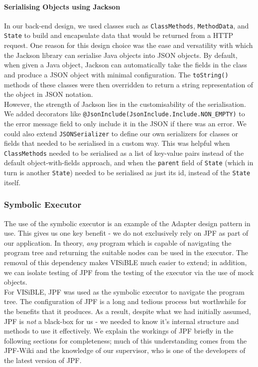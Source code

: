 \documentclass[titlepage,11pt]{article}
\begin{document}
\paragraph{Serialising Objects using Jackson}

In our back-end design, we used classes such as \texttt{ClassMethods}, \texttt{MethodData}, and \texttt{State} to build and encapsulate data that would be returned from a HTTP request. One reason for this design choice was the ease and versatility with which the Jackson library can serialise Java objects into JSON objects. By default, when given a Java object, Jackson \cite{jackson} can automatically take the fields in the class and produce a JSON object with minimal configuration. The \texttt{toString()} methods of these classes were then overridden to return a string representation of the object in JSON notation. \\

However, the strength of Jackson lies in the customisability of the serialisation. We added decorators like \texttt{@JsonInclude(JsonInclude.Include.NON\_EMPTY)} to the error message field to only include it in the JSON if there was an error. We could also extend \texttt{JSONSerializer} to define our own serializers for classes or fields that needed to be serialised in a custom way. This was helpful when \texttt{ClassMethods} needed to be serialised as a list of key-value pairs instead of the default object-with-fields approach, and when the \texttt{parent} field of \texttt{State} (which in turn is another \texttt{State}) needed to be serialised as just its id, instead of the \texttt{State} itself.

\subsubsection{Symbolic Executor}
The use of the symbolic executor is an example of the Adapter design pattern in use. This gives us one key benefit - we do not exclusively rely on JPF as part of our application. In theory, \textit{any} program which is capable of navigating the program tree and returning the suitable nodes can be used in the executor. The removal of this dependency makes VISiBLE much easier to extend; in addition, we can isolate testing of JPF from the testing of the executor via the use of mock objects. \\

For VISiBLE, JPF was used as the symbolic executor to navigate the program tree. The configuration of JPF is a long and tedious process but worthwhile for the benefits that it produces. As a result, despite what we had initially assumed, JPF is \textit{not} a black-box for us - we needed to know it's internal structure and methods to use it effectively. We explain the workings of JPF briefly in the following sections for completeness; much of this understanding comes from the JPF-Wiki \cite{corinapasareanu2016} and the knowledge of our supervisor, who is one of the developers of the latest version of JPF. 
\end{document}
